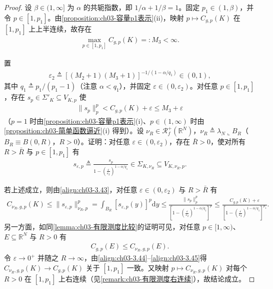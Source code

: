 \documentclass[../../main.tex]{subfiles}%
\begin{document}
\begin{proof}
设 $\beta\in(1,\infty]$ 为 $\alpha$ 的共轭指数，即 $1/\alpha+1/\beta=1$。固定 $p_1\in(1,\beta)$，并令 $p\in[1,p_1]$。由\cref{proposition:ch03-容量p1表示}(ii)，映射 $p\mapsto C_{g,p}(K)$ 在 $[1,p_1]$ 上上半连续，故存在
\begin{align}
\max_{p\in[1,p_1]}C_{g,p}(K)=:M_3<\infty.\label{align:ch03-3.42}
\end{align}

置
\begin{align*}
\varepsilon_2\triangleq\left[(M_2+1)(M_3+1)\right]^{-1/(1-\alpha/q_1)}\in(0,1),
\end{align*}
其中 $q_1\triangleq p_1/(p_1-1)$（注意 $\alpha<q_1$），并固定 $\varepsilon\in(0,\varepsilon_2)$。对任意 $p\in[1,p_1]$，存在 $s_p\in\Sigma'_K\subseteq V_{K,p}$ 使
\begin{align}
\|s_p\|_p^p<C_{g,p}(K)+\varepsilon\leqslant M_3+\varepsilon\label{align:ch03-3.43}
\end{align}
（$p=1$ 时由\cref{proposition:ch03-容量p1表示}(i)、$p\in(1,\infty)$ 时由\cref{proposition:ch03-简单函数逼近}(i) 得到）。设 $\nu_R\in\mathscr{R}^+_f(\mathbb{R}^N)$，$\nu_R\triangleq\lambda_N\llcorner B_R$（$B_R\equiv B(0,R)$，$R>0$）。证明：对任意 $\varepsilon\in(0,\varepsilon_2)$，存在 $\bar R>0$，使对所有 $R>\bar R$ 与 $p\in[1,p_1]$ 有
\begin{align*}
s_{\varepsilon,p}\triangleq\frac{s_p}{1-\left(\frac{\varepsilon}{\varepsilon_2}\right)^{1-\alpha/q_1}}\in\Sigma_{K,\nu_R}\subseteq V_{K,\nu_R,p}.
\end{align*}

若上述成立，则由\eqref{align:ch03-3.43}，对任意 $\varepsilon\in(0,\varepsilon_2)$ 与 $R>\bar R$ 有
\begin{align}
C_{\nu_R,g,p}(K)\leqslant\|s_{\varepsilon,p}\|_{\nu_R,p}^p=\int_{B_R}\left[s_{\varepsilon,p}(y)\right]^p\mathrm{d}y
\leqslant\frac{\|s_p\|_p^p}{\left[1-\left(\frac{\varepsilon}{\varepsilon_2}\right)^{1-\alpha/q_1}\right]^p}
\leqslant\frac{C_{g,p}(K)+\varepsilon}{\left[1-\left(\frac{\varepsilon}{\varepsilon_2}\right)^{1-\alpha/q_1}\right]^{p_1}} .\label{align:ch03-3.44}
\end{align}
另一方面，如同\cref{lemma:ch03-有限测度比较}的证明可见，对任意 $p\in[1,\infty)$、$E\subseteq\mathbb{R}^N$ 与 $R>0$ 有
\begin{align}
C_{g,p}(E)\leqslant C_{\nu_R,g,p}(E).\label{align:ch03-3.45}
\end{align}
令 $\varepsilon\to0^+$ 并随之 $R\to\infty$，由\eqref{align:ch03-3.44}--\eqref{align:ch03-3.45}得 $C_{\nu_R,g,p}(K)\to C_{g,p}(K)$ 关于 $[1,p_1]$ 一致。又映射 $p\mapsto C_{\nu_R,g,p}(K)$ 对每个 $R>0$ 在 $[1,p_1]$ 上右连续（见\cref{remark:ch03-有限测度右连续}），故结论成立。


\end{proof}
\end{document}
